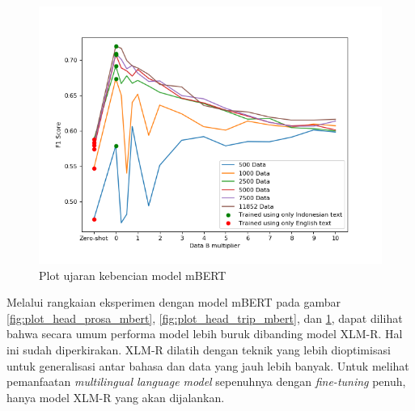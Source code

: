 \begin{enumerate}
            \begin{figure}[htb]
                \centering
                \includegraphics[width=\linewidth]{resources/plot-head-toxic-mbert.png}
                \caption{Plot ujaran kebencian model mBERT}
                \label{fig:plot_head_toxic_mbert}
            \end{figure}

        \end{enumerate}

        Melalui rangkaian eksperimen dengan model mBERT pada gambar \ref{fig:plot_head_prosa_mbert}, \ref{fig:plot_head_trip_mbert}, dan \ref{fig:plot_head_toxic_mbert}, dapat dilihat bahwa secara umum performa model lebih buruk dibanding model XLM-R. Hal ini sudah diperkirakan. XLM-R dilatih dengan teknik yang lebih dioptimisasi untuk generalisasi antar bahasa dan data yang jauh lebih banyak. Untuk melihat pemanfaatan \textit{multilingual language model} sepenuhnya dengan \textit{fine-tuning} penuh, hanya model XLM-R yang akan dijalankan.

    \vspace{15mm}

